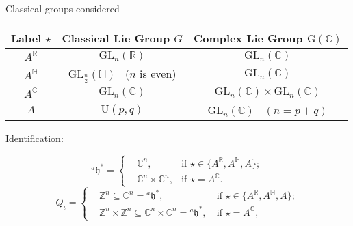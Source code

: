 \documentclass[fleqn,xcolor=dvipsnames]{beamer}
\newcommand{\BC}{{\mathbb {C}}}
\newcommand{\BH}{{\mathbb {H}}}
\newcommand{\BR}{{\mathbb {R}}}
\newcommand{\BZ}{{\mathbb {Z}}}
\newcommand{\RG}{{\mathrm {G}}}
\newcommand{\fh}{\mathfrak{h}}
\newcommand{\GL}{{\mathrm{GL}}}
\newcommand{\U}{{\mathrm{U}}}
\begin{document}
\begin{frame}{Classical groups considered}

\begin{center}
   \begin{tabular}{c|c|c}
      \toprule
      Label $\star $ & Classical Lie Group $G$ & Complex Lie Group $\RG(\BC)$    \\
      \midrule
      $A^{\BR}$      & $\GL_n(\BR)$          & $\GL_n(\BC)$                   \\
      $A^{\BH}$      & $\GL_{\frac{n}{2}}(\BH)$ \  ($n$ is even)      & $\GL_n(\BC)$                   \\
      $A^{\BC}$      & $\GL_n(\BC)$          & $\GL_n(\BC) \times \GL_n(\BC)$ \\
      $A$            & $\U(p,q)$              & $\GL_n(\BC)$ \ $(n = p + q)$                   \\
      \bottomrule
   \end{tabular}
\end{center}

\pause Identification:

\[{^{a}\fh}^* = \left\{
   \begin{aligned}
       & \BC^n, & \textrm{if $\star \in \{A^\BR,A^\BH,A\}$};\\
       & \BC^n \times \BC^n, & \textrm{if $\star = A^\BC$}.
   \end{aligned}
   \right.
\]
\[
    Q_{\iota} = \left\{
    \begin{aligned}
        & \BZ^n \subseteq \BC^n = {^{a}\fh^*}, \ &\textrm{if $\star \in \{A^\BR, A^\BH,A\}$};\\
        & \BZ^n \times \BZ^n \subseteq \BC^n \times \BC^n = {^{a}\fh^*}, \ &\textrm{if $\star = A^\BC$},
   \end{aligned}
   \right.
\]
\end{frame}
\end{document}
